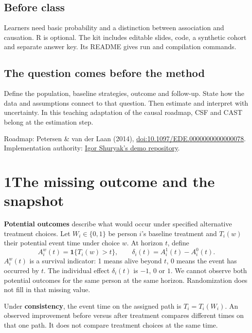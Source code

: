 \documentclass[11pt,letterpaper]{article}
\newcommand{\ind}{\mathbf{1}}
\newcommand{\term}[1]{\textbf{\color{ink}#1}}
\newcommand{\source}[1]{{\small\color{muted}#1}}
\begin{document}
\subsection{Before class}
Learners need basic probability and a distinction between association and
causation. R is optional. The kit includes editable slides, code, a synthetic
cohort and separate answer key. Its README gives run and compilation commands.

\subsection{The question comes before the method}
Define the population, baseline strategies, outcome and follow-up. State how
the data and assumptions connect to that question. Then estimate and interpret
with uncertainty. In this teaching adaptation of the causal roadmap, CSF and
CAST belong at the estimation step.

\source{Roadmap: Petersen \& van der Laan (2014),
\href{https://doi.org/10.1097/EDE.0000000000000078}{doi:10.1097/EDE.0000000000000078}.
Implementation authority: \href{https://github.com/ishuryak/cast_demo_website}{Igor Shuryak's demo repository}.}

\newpage
\section{1\enspace The missing outcome and the snapshot}
\term{Potential outcomes} describe what would occur under specified alternative
treatment choices. Let $W_i\in\{0,1\}$ be person $i$'s baseline treatment and
$T_i(w)$ their potential event time under choice $w$. At horizon $t$, define
\[
 A_i^w(t)=\ind\{T_i(w)>t\},\qquad
 \delta_i(t)=A_i^1(t)-A_i^0(t).
\]
$A_i^w(t)$ is a survival indicator: 1 means alive beyond $t$, 0 means the event
has occurred by $t$. The individual effect $\delta_i(t)$ is $-1$, 0 or $1$.
We cannot observe both potential outcomes for the same person at the same
horizon. Randomization does not fill in that missing value.

Under \term{consistency}, the event time on the assigned path is
$T_i=T_i(W_i)$. An observed improvement before versus after treatment compares
different times on that one path. It does not compare treatment choices at
the same time.
\end{document}
